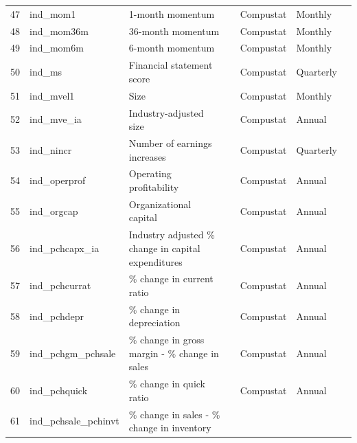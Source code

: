 \documentclass[a4paper, table]{article}
\begin{document}
\begin{landscape}
\begin{center}
\begin{longtable}{lllllll}
			47 & ind\_mom1 & 1-month momentum & 
				\cite{jegadeesh_returns_1993} & Compustat & Monthly \\
			48 & ind\_mom36m\footnotemark[\value{footnote}] & 36-month momentum & 
				\cite{jegadeesh_returns_1993} & Compustat & Monthly \\
			49 & ind\_mom6m & 6-month momentum & 
				\cite{jegadeesh_returns_1993} & Compustat & Monthly \\
			50 & ind\_ms & Financial statement score & 
				\cite{mohanram_separating_2005} & Compustat & Quarterly \\
			51 & ind\_mvel1 & Size & 
				\cite{banz_relationship_1981} & Compustat & Monthly \\
			52 & ind\_mve\_ia & Industry-adjusted size & 
				\cite{asness_predicting_2000} & Compustat & Annual \\
			53 & ind\_nincr & Number of earnings increases & 
				\cite{barth_market_1999} & Compustat & Quarterly \\
			54 & ind\_operprof\footnotemark[\value{footnote}] & Operating profitability & 
				\cite{fama_five-factor_2015} & Compustat & Annual \\
			55 & ind\_orgcap\footnotemark[\value{footnote}] & Organizational capital & 
				\cite{eisfeldt_organization_2013} & Compustat & Annual \\
			56 & ind\_pchcapx\_ia\footnotemark[\value{footnote}] & Industry adjusted \% change in capital expenditures & 
				\cite{abarbanell_abnormal_1998} & Compustat & Annual \\
			57 & ind\_pchcurrat\footnotemark[\value{footnote}] & \% change in current ratio & 
				\cite{ou_financial_1989} & Compustat & Annual \\
			58 & ind\_pchdepr\footnotemark[\value{footnote}] & \% change in depreciation & 
				\cite{holthausen_prediction_1992} & Compustat & Annual \\
			59 & ind\_pchgm\_pchsale\footnotemark[\value{footnote}] & \% change in gross margin - \% change in sales & 
				\cite{abarbanell_abnormal_1998} & Compustat & Annual \\
			60 & ind\_pchquick\footnotemark[\value{footnote}] & \% change in quick ratio & 
				\cite{ou_financial_1989} & Compustat & Annual \\
			61 & ind\_pchsale\_pchinvt\footnotemark[\value{footnote}] & \% change in sales - \% change in inventory & 

\end{longtable}
\end{center}
\end{landscape}
\end{document}
